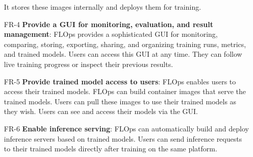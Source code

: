 \begin{itemize}
        It stores these images internally and deploys them for training.
    \item [FR-4] {\textbf{Provide a GUI for monitoring, evaluation, and result management}}: \label{FR-4}
        FLOps provides a sophisticated GUI for monitoring, comparing, storing, exporting, sharing, and organizing training runs, metrics, and trained models.
        Users can access this GUI at any time.
        They can follow live training progress or inspect their previous results.
    \item [FR-5] {\textbf{Provide trained model access to users}}: \label{FR-5}
        FLOps enables users to access their trained models.
        FLOps can build container images that serve the trained models.
        Users can pull these images to use their trained models as they wish.
        Users can see and access their models via the GUI.
    \item [FR-6] {\textbf{Enable inference serving}}: \label{FR-6}
        FLOps can automatically build and deploy inference servers based on trained models.
        Users can send inference requests to their trained models directly after training on the same platform.
\end{itemize}